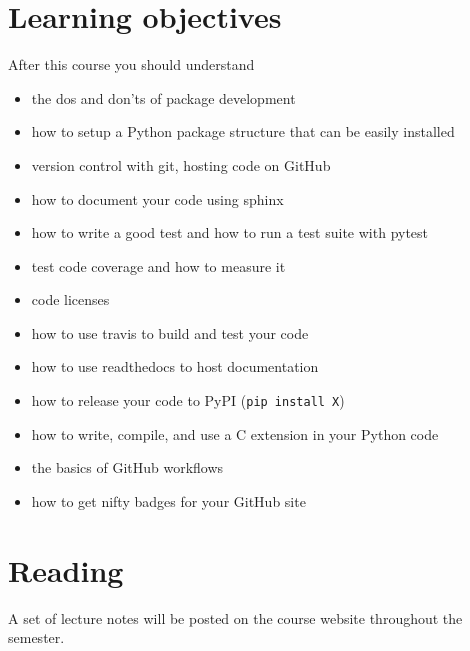 \documentclass{article}
\begin{document}
\section*{Learning objectives}

After this course you should understand

\begin{itemize}

  \item the dos and don'ts of package development

  \item how to setup a Python package structure that can be easily installed

  \item version control with git, hosting code on GitHub

  \item how to document your code using sphinx

  \item how to write a good test and how to run a test suite with pytest

  \item test code coverage and how to measure it

  \item code licenses

  \item how to use travis to build and test your code

  \item how to use readthedocs to host documentation
 
  \item how to release your code to PyPI (\texttt{pip install X})

  \item how to write, compile, and use a C extension in your Python code

  \item the basics of GitHub workflows

  \item how to get nifty badges for your GitHub site

\end{itemize}

\section*{Reading}

A set of lecture notes will be posted on the course website throughout
 the semester.
\end{document}

